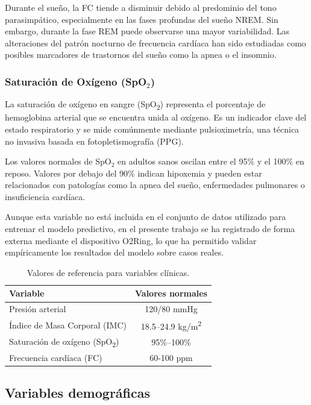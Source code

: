 Durante el sueño, la FC tiende a disminuir debido al predominio del tono parasimpático, especialmente en las fases profundas del sueño NREM. Sin embargo, durante la fase REM puede observarse una mayor variabilidad. Las alteraciones del patrón nocturno de frecuencia cardíaca han sido estudiadas como posibles marcadores de trastornos del sueño como la apnea o el insomnio.

\subsubsection{Saturación de Oxígeno (SpO$_2$)}

La saturación de oxígeno en sangre (SpO\textsubscript{2}) representa el porcentaje de hemoglobina arterial que se encuentra unida al oxígeno. Es un indicador clave del estado respiratorio y se mide comúnmente mediante pulsioximetría, una técnica no invasiva basada en fotopletismografía (PPG).

Los valores normales de SpO$_2$ en adultos sanos oscilan entre el 95\% y el 100\% en reposo. Valores por debajo del 90\% indican hipoxemia y pueden estar relacionados con patologías como la apnea del sueño, enfermedades pulmonares o insuficiencia cardíaca.

Aunque esta variable no está incluida en el conjunto de datos utilizado para entrenar el modelo predictivo, en el presente trabajo se ha registrado de forma externa mediante el dispositivo O2Ring, lo que ha permitido validar empíricamente los resultados del modelo sobre casos reales.

\begin{table}[H]
\centering
\label{tab:variables_clinicas}
\begin{tabular}{|l|c|}
\hline
\textbf{Variable} & \textbf{Valores normales} \\
\hline
Presión arterial & 120/80 mmHg \\
Índice de Masa Corporal (IMC) & 18.5–24.9 kg/m\textsuperscript{2} \\
Saturación de oxígeno (SpO\textsubscript{2}) & 95\%–100\% \\
Frecuencia cardíaca (FC) & 60-100 ppm \\
\hline
\end{tabular}
\caption{Valores de referencia para variables clínicas.}
\end{table}



\subsection{Variables demográficas}
